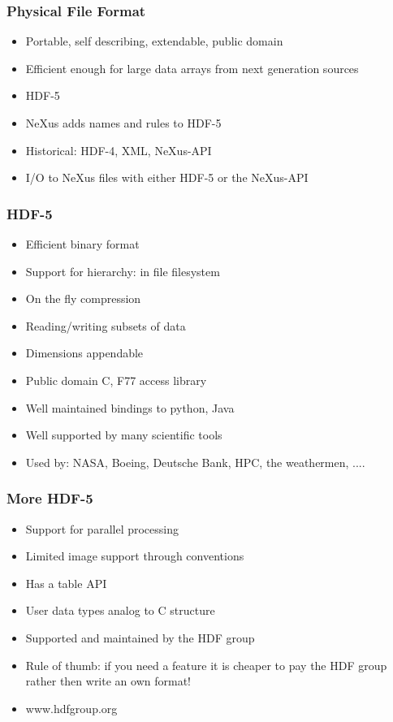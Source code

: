 \documentclass{beamer}
\begin{document}
\begin{frame} \frametitle{Physical File Format}
\begin{itemize}
\item<1-> Portable, self describing, extendable, public domain
\item<1-> Efficient enough for large data arrays from next generation sources
\item<2-> HDF-5
\item<2-> NeXus adds names and rules to HDF-5
\item<3-> Historical: HDF-4, XML, NeXus-API 
\item<3-> I/O to NeXus files with either HDF-5 or the NeXus-API
\end{itemize}
\end{frame}

\begin{frame} \frametitle{HDF-5}
\begin{itemize}
\item Efficient binary format
\item Support for hierarchy: in file filesystem
\item On the fly compression
\item Reading/writing subsets of data
\item Dimensions appendable
\item Public domain C, F77 access library
\item Well maintained bindings to python, Java
\item Well supported by many scientific tools
\item Used by: NASA, Boeing, Deutsche Bank, HPC, the weathermen, .... 
\end{itemize}
\end{frame}

\begin{frame} \frametitle{More HDF-5}
\begin{itemize}
\item Support for parallel processing
\item Limited image support through conventions
\item Has a table API
\item User data types analog to C structure 
\item Supported and maintained by the HDF group
\item Rule of thumb: if you need a feature it is cheaper to pay the HDF group rather then write an own format!
\item www.hdfgroup.org
\end{itemize}
\end{frame}
\end{document}
